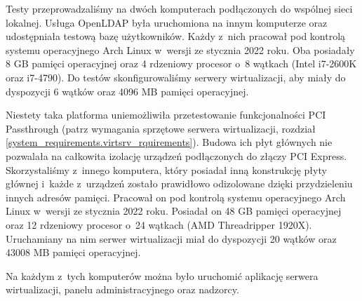 \documentclass[../analiza-rozwiazania.tex]{subfiles}
\begin{document}
Testy przeprowadzaliśmy na dwóch komputerach podłączonych do wspólnej sieci lokalnej.
Usługa OpenLDAP była uruchomiona na innym komputerze oraz udostępniała testową bazę użytkowników.
Każdy z~nich pracował pod kontrolą systemu operacyjnego Arch Linux w~wersji ze stycznia 2022 roku.
Oba posiadały 8 GB pamięci operacyjnej oraz 4 rdzeniowy procesor o~8 wątkach (Intel i7-2600K oraz i7-4790).
Do testów skonfigurowaliśmy serwery wirtualizacji, aby miały do dyspozycji 6 wątków oraz 4096 MB pamięci operacyjnej.

Niestety taka platforma uniemożliwiła przetestowanie funkcjonalności PCI Passthrough (patrz wymagania sprzętowe serwera wirtualizacji, rozdział \ref{system_requirements.virtsrv_rquirements}).
Budowa ich płyt głównych nie pozwalała na całkowita izolację urządzeń podłączonych do złączy PCI Express.
Skorzystaliśmy z~innego komputera, który posiadał inną konstrukcję płyty głównej i~każde z~urządzeń zostało prawidłowo odizolowane dzięki przydzieleniu innych adresów pamięci.
Pracował on pod kontrolą systemu operacyjnego Arch Linux w~wersji ze stycznia 2022 roku.
Posiadał on 48 GB pamięci operacyjnej oraz 12 rdzeniowy procesor o~24 wątkach (AMD Threadripper 1920X).
Uruchamiany na nim serwer wirtualizacji miał do dyspozycji 20 wątków oraz 43008 MB pamięci operacyjnej.

Na każdym z~tych komputerów można było uruchomić aplikację serwera wirtualizacji, panelu administracyjnego oraz nadzorcy.
\end{document}
